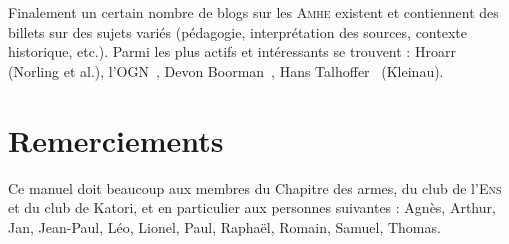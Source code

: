 Finalement un certain nombre de blogs sur les \textsc{Amhe} existent et contiennent des billets sur des sujets variés (pédagogie, interprétation des sources, contexte historique, etc.).
Parmi les plus actifs et intéressants se trouvent : Hroarr~\cite{Blog:Hroarr} (Norling et al.), l'OGN~\cite{Blog:OGN}, Devon Boorman~\cite{Blog:Boorman}, Hans Talhoffer~\cite{Blog:HansTalhoffer} (Kleinau).


\section{Remerciements}


Ce manuel doit beaucoup aux membres du Chapitre des armes, du club de l'\textsc{Ens} et du club de Katori, et en particulier aux personnes suivantes : Agnès, Arthur, Jan, Jean-Paul, Léo, Lionel, Paul, Raphaël, Romain, Samuel, Thomas.
